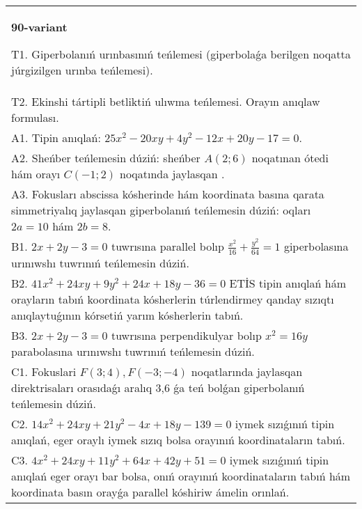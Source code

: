 \documentclass{article}
\begin{document}
\begin{tabular}{m{17cm}}
\textbf{90-variant}
\newline

T1. Giperbolanıń urınbasınıń teńlemesi (giperbolaǵa berilgen noqatta júrgizilgen urınba teńlemesi).\\

T2. Ekinshi tártipli betliktiń ulıwma teńlemesi. Orayın anıqlaw formulası.\\

A1. Tipin anıqlań: $25 x^{2}-20 xy+4 y^{2}-12 x+20 y-17=0$.\\

A2. Sheńber teńlemesin dúziń: sheńber $A (2;6 ) $ noqatınan ótedi hám orayı $C (-1;2) $ noqatında jaylasqan .\\

A3. Fokusları abscissa kósherinde hám koordinata basına qarata simmetriyalıq jaylasqan giperbolanıń teńlemesin dúziń: oqları $2 a=10$ hám $2 b=8$.\\

B1. $2x + 2y - 3 = 0$ tuwrısına parallel bolıp $\frac{x^{2}}{16} + \frac{y^{2}}{64} = 1$ giperbolasına urınıwshı tuwrınıń teńlemesin dúziń.  \\

B2. $41x^{2} + 24xy + 9y^{2} + 24x + 18y - 36 = 0$ ETİS tipin anıqlań hám orayların tabıń koordinata kósherlerin túrlendirmey qanday sızıqtı anıqlaytuǵının kórsetiń yarım kósherlerin tabıń.  \\

B3. $2x + 2y - 3 = 0$ tuwrısına perpendikulyar bolıp $x^{2} = 16y$ parabolasına urınıwshı tuwrınıń teńlemesin dúziń.  \\

C1. Fokuslari $F(3;4), F(-3;-4)$ noqatlarında jaylasqan direktrisaları orasıdaǵı aralıq 3,6 ǵa teń bolǵan giperbolanıń teńlemesin dúziń.  \\

C2. $14x^{2} + 24xy + 21y^{2} - 4x + 18y - 139 = 0$ iymek sızıǵınıń tipin anıqlań, eger oraylı iymek sızıq bolsa orayınıń koordinataların tabıń.  \\

C3. $4x^{2} + 24xy + 11y^{2} + 64x + 42y + 51 = 0$ iymek sızıǵınıń tipin anıqlań eger orayı bar bolsa, onıń orayınıń koordinataların tabıń hám koordinata basın orayǵa parallel kóshiriw ámelin orınlań.  \\

\end{tabular}
\vspace{1cm}
\end{document}
